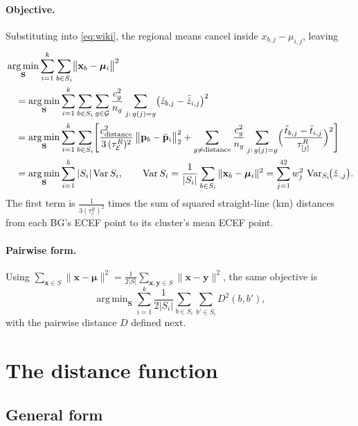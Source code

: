 \documentclass[11pt]{article}
\newcommand{\x}{\mathbf{x}}
\newcommand{\bmu}{\boldsymbol{\mu}}
\newcommand{\argmin}{\mathop{\operatorname{arg\,min}}}
\newcommand{\Var}{\operatorname{Var}}
\begin{document}
\paragraph{Objective.} Substituting into \eqref{eq:wiki}, the regional means cancel inside
$x_{b,j}-\mu_{i,j}$, leaving
\begin{align}
&\argmin_{\mathbf S}\sum_{i=1}^{k}\sum_{b\in S_i}\bigl\|\x_b-\bmu_i\bigr\|^2 \notag\\
&\quad=\argmin_{\mathbf S}\sum_{i=1}^{k}\sum_{b\in S_i}\sum_{g\in\mathcal G}\frac{c_g^2}{n_g}
\sum_{j:\,g(j)=g}\bigl(\check z_{b,j}-\bar{\check z}_{i,j}\bigr)^2 \notag\\
&\quad=\argmin_{\mathbf S}\sum_{i=1}^{k}\sum_{b\in S_i}\Biggl[
\frac{c_{\text{distance}}^2}{3\,(\tau^R_{\mathcal E})^2}\,\bigl\|\mathbf p_b-\bar{\mathbf p}_i\bigr\|_2^2
+\sum_{g\neq\text{distance}}\frac{c_g^2}{n_g}\sum_{j:\,g(j)=g}
\Bigl(\frac{\tilde t_{b,j}-\bar t_{i,j}}{\tau^R_{[j]}}\Bigr)^2\Biggr] \label{eq:obj}\\
&\quad=\argmin_{\mathbf S}\sum_{i=1}^{k}|S_i|\Var S_i,\qquad
\Var S_i=\frac1{|S_i|}\sum_{b\in S_i}\|\x_b-\bmu_i\|^2=\sum_{j=1}^{42}w_j^2\,\Var_{S_i}\!\bigl(\check z_{\cdot,j}\bigr). \notag
\end{align}
The first term is $\tfrac{1}{3(\tau^R_{\mathcal E})^2}$ times the sum of squared straight-line
(km) distances from each BG's ECEF point to its cluster's mean ECEF point.

\paragraph{Pairwise form.} Using
$\sum_{\x\in S}\|\x-\bmu\|^2=\frac{1}{2|S|}\sum_{\x,\mathbf y\in S}\|\x-\mathbf y\|^2$,
the same objective is
\[
\argmin_{\mathbf S}\sum_{i=1}^{k}\frac{1}{2|S_i|}\sum_{b\in S_i}\sum_{b'\in S_i}D^2(b,b'),
\]
with the pairwise distance $D$ defined next.

\section{The distance function}

\subsection{General form}
\end{document}
